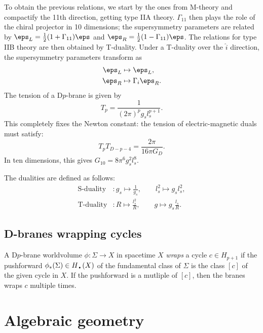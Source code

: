         To obtain the previous relations, we start by the ones from M-theory and compactify the 11th direction, getting type IIA theory. $\Gamma_{11}$ then plays the role of the chiral projector in 10 dimensions; the supersymmetry parameters are related by $\eps_L=\frac{1}{2}(1+\Gamma_{11})\eps$ and $\eps_R=\frac{1}{2}(1-\Gamma_{11})\eps$. The relations for type IIB theory are then obtained by T-duality. Under a T-duality over the $\hat{i}$ direction, the supersymmetry parameters transform as
        \begin{align*}
            \eps_L &\mapsto \eps_L,\\
            \eps_R &\mapsto \Gamma_i\eps_R.
        \end{align*}
        The tension of a D$p$-brane is given by
        \begin{equation}
            T_{p} = \frac{1}{(2\pi)^pg_sl^{p+1}_s}.
        \end{equation}
        This completely fixes the Newton constant: the tension of electric-magnetic duals must satisfy:
        \begin{equation}
            T_pT_{D-p-4} = \frac{2\pi}{16\pi G_D}.
        \end{equation}
        In ten dimensions, this gives $G_{10}=8\pi^6g^2_sl^8_s$.

        The dualities are defined as follows:
        \begin{align*}
            \text{S-duality} &: g_s\mapsto\frac{1}{g_s},\qquad l^2_s\mapsto g_sl^2_s,\\
            \text{T-duality} &: R\mapsto\frac{l^2_s}{R},\qquad g\mapsto g_s\frac{l_s}{R}.
        \end{align*}

    \subsection{D-branes wrapping cycles}

        A D$p$-brane worldvolume $\phi:\Sigma\to X$ in spacetime $X$ \emph{wraps} a cycle $c\in H_{p+1}$ if the pushforward $\phi_*(\Sigma)\in H_\text{\textbullet}(X)$ of the fundamental class of $\Sigma$ is the class $[c]$ of the given cycle in $X$. If the pushforward is a mutliple of $[c]$, then the branes wraps $c$ multiple times.

\section{Algebraic geometry}


